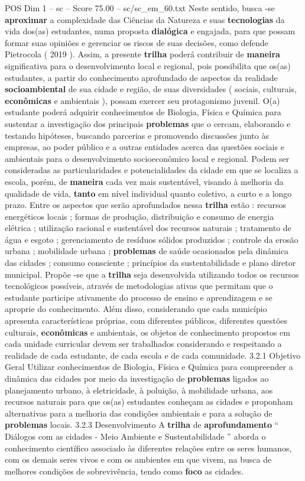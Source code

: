 \begin{textsample}{POS Dim 1 – sc – Score 75.00 – sc/sc\_em\_60.txt}
Neste sentido, busca -se \textbf{aproximar} a complexidade das Ciências da Natureza e suas \textbf{tecnologias} da vida dos(as) estudantes, numa proposta \textbf{dialógica} e engajada, para que possam formar suas opiniões e gerenciar os riscos de suas decisões, como defende Pietrocola ( 2019 ).
Assim, a presente \textbf{trilha} poderá contribuir de \textbf{maneira} significativa para o desenvolvimento local e regional, pois possibilita que os(as) estudantes, a partir do conhecimento aprofundado de aspectos da realidade \textbf{socioambiental} de sua cidade e região, de suas diversidades ( sociais, culturais, \textbf{econômicas} e ambientais ), possam exercer seu protagonismo juvenil.
O(a) estudante poderá adquirir conhecimentos de Biologia, Física e Química para sustentar a investigação dos principais \textbf{problemas} que o cercam, elaborando e testando hipóteses, buscando parcerias e promovendo discussões junto às empresas, ao poder público e a outras entidades acerca das questões sociais e ambientais para o desenvolvimento socioeconômico local e regional.
Podem ser consideradas as particularidades e potencialidades da cidade em que se localiza a escola, porém, de \textbf{maneira} cada vez mais sustentável, visando à melhoria da qualidade de vida, \textbf{tanto} em nível individual quanto coletivo, a curto e a longo prazo.
Entre os aspectos que serão aprofundados nessa \textbf{trilha} estão : recursos energéticos locais ; formas de produção, distribuição e consumo de energia elétrica ; utilização racional e sustentável dos recursos naturais ; tratamento de água e esgoto ; gerenciamento de resíduos sólidos produzidos ; controle da erosão urbana ; mobilidade urbana ; \textbf{problemas} de saúde ocasionados pela dinâmica das cidades ; consumo consciente ; princípios da sustentabilidade e plano diretor municipal.
Propõe -se que a \textbf{trilha} seja desenvolvida utilizando todos os recursos tecnológicos possíveis, através de metodologias ativas que permitam que o estudante participe ativamente do processo de ensino e aprendizagem e se aproprie do conhecimento.
Além disso, considerando que cada município apresenta características próprias, com diferentes públicos, diferentes questões culturais, \textbf{econômicas} e ambientais, os objetos de conhecimento propostos em cada unidade curricular devem ser trabalhados considerando e respeitando a realidade de cada estudante, de cada escola e de cada comunidade. 3.2.1 Objetivo Geral Utilizar conhecimentos de Biologia, Física e Química para compreender a dinâmica das cidades por meio da investigação de \textbf{problemas} ligados ao planejamento urbano, à eletricidade, à poluição, à mobilidade urbana, aos recursos naturais para que os(as) estudantes conheçam as cidades e proponham alternativas para a melhoria das condições ambientais e para a solução de \textbf{problemas} locais. 3.2.3 Desenvolvimento A \textbf{trilha} de \textbf{aprofundamento} “ Diálogos com as cidades - Meio Ambiente e Sustentabilidade ” aborda o conhecimento científico associado às diferentes relações entre os seres humanos, com os demais seres vivos e com os ambientes em que vivem, na busca de melhores condições de sobrevivência, tendo como \textbf{foco} as cidades.

\end{textsample}
